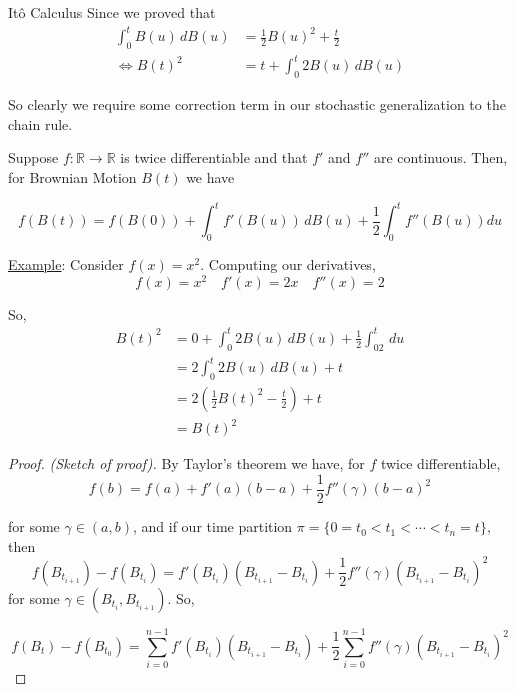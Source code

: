 \documentclass[12pt]{article}
\newenvironment{theorem}[2][Theorem:]{\begin{trivlist} %
\item[\hskip \labelsep {\bfseries #1}\hskip \labelsep {\bfseries #2.}]}{\end{trivlist}}
\begin{document}
\begin{section}{It\^{o} Calculus}
Since we proved that
\begin{align*}
	\int^t_0 B(u)\,dB(u) &= \frac{1}{2}B(u)^2 + \frac{t}{2} \\
	\iff B(t)^2 &= t + \int^t_0 2B(u)\,dB(u)
\end{align*}

So clearly we require some correction term in our stochastic generalization to the chain rule.

\begin{theorem}{It\^{o}'s Rule} Suppose $f:\mathbb R\rightarrow \mathbb R$ is twice differentiable and that $f'$ and $f''$ are continuous. Then, for Brownian Motion $B(t)$ we have

\begin{equation*}
	f(B(t)) = f(B(0)) + \int^t_0f'(B(u))\,dB(u) + \frac{1}{2}\int^t_0 f''(B(u))du
\end{equation*}

\underline{Example}: Consider $f(x) = x^2$. Computing our derivatives,
\begin{equation*}
	f(x) = x^2  \quad f'(x) = 2x  \quad f''(x) = 2
\end{equation*}

So, 
\begin{align*}
	B(t)^2 &= 0 + \int^t_0 2B(u)\,dB(u) + \frac{1}{2}\int^t_02\,du \\
	&= 2\int^t_0 2B(u)\,dB(u) + t \\
	&= 2(\frac{1}{2} B(t)^2 - \frac{t}{2}) + t \\
	&= B(t)^2
\end{align*}

\begin{proof} {\em (Sketch of proof).} By Taylor's theorem we have, for $f$ twice differentiable,
\begin{equation*}
	f(b) = f(a) + f'(a)(b-a) + \frac{1}{2}f''(\gamma)(b-a)^2
\end{equation*}

for some $\gamma \in (a,b)$, and if our time partition $\pi = \{0 = t_0 < t_1 < \cdots < t_n = t\}$, then
\begin{equation*}
	f(B_{t_{i+1}}) - f(B_{t_i}) = f'(B_{t_i})(B_{t_{i+1}} - B_{t_i}) + \frac{1}{2}f''(\gamma)(B_{t_{i+1}} - B_{t_i})^2
\end{equation*}
for some $\gamma \in (B_{t_i},B_{t_{i+1}})$. So,

\begin{equation*}
	f(B_t) - f(B_{t_0}) = \sum^{n-1}_{i=0}f'(B_{t_i})(B_{t_{i+1}} - B_{t_i})  + \frac{1}{2}\sum^{n-1}_{i=0}f''(\gamma)(B_{t_{i+1}} - B_{t_i})^2
\end{equation*}


\end{proof}
\end{theorem}
\end{section}
\end{document}
